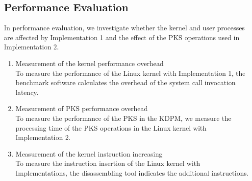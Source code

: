 \subsection{Performance Evaluation}



In performance evaluation, we investigate whether the kernel and user processes
are affected by Implementation 1 and the effect of the PKS operations used in
Implementation 2.


\begin{enumerate}%

\item Measurement of the kernel performance overhead\\
To measure the performance of the Linux kernel with Implementation 1, the benchmark
software calculates the overhead of the system call invocation latency.

\item Measurement of PKS performance overhead\\
To measure the performance of the PKS in the KDPM, we measure the processing
time of the PKS operations in the Linux kernel with Implementation 2.

\item Measurement of the kernel instruction increasing\\
To measure the instruction insertion of the Linux kernel with Implementations,
the disassembling tool indicates the additional instructions. 

\end{enumerate}
  

